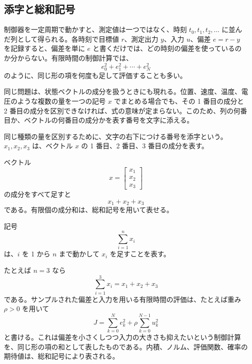 \subsection{添字と総和記号}

制御器を一定周期で動かすと、測定値は一つではなく、時刻 $t_0,t_1,t_2,\ldots$ に並んだ列として得られる。各時刻で目標値 $r$、測定出力 $y$、入力 $u$、偏差 $e=r-y$ を記録すると、偏差を単に $e$ と書くだけでは、どの時刻の偏差を使っているのか分からない。有限時間の制御計算では、
\begin{equation}
  e_0^2+e_1^2+\cdots+e_N^2
\end{equation}
のように、同じ形の項を何度も足して評価することも多い。

同じ問題は、状態ベクトルの成分を扱うときにも現れる。位置、速度、温度、電圧のような複数の量を一つの記号 $x$ でまとめる場合でも、その 1 番目の成分と 2 番目の成分を区別できなければ、式の意味が定まらない。このため、列の何番目か、ベクトルの何番目の成分かを表す番号を文字に添える。

\begin{definition}[添字]
同じ種類の量を区別するために、文字の右下につける番号を添字という。$x_1,x_2,x_3$ は、ベクトル $x$ の 1 番目、2 番目、3 番目の成分を表す。
\end{definition}

ベクトル
\begin{equation}
  x=\begin{bmatrix}x_1\\x_2\\x_3\end{bmatrix}
\end{equation}
の成分をすべて足すと
\begin{equation}
  x_1+x_2+x_3
\end{equation}
である。有限個の成分和は、総和記号を用いて表せる。

\begin{definition}[総和記号]
記号
\begin{equation}
  \sum_{i=1}^{n}x_i
\end{equation}
は、$i$ を 1 から $n$ まで動かして $x_i$ を足すことを表す。
\end{definition}

たとえば $n=3$ なら
\begin{equation}
  \sum_{i=1}^{3}x_i=x_1+x_2+x_3
\end{equation}
である。サンプルされた偏差と入力を用いる有限時間の評価は、たとえば重み $\rho>0$ を用いて
\begin{equation}
  J=\sum_{k=0}^{N}e_k^2+\rho\sum_{k=0}^{N-1}u_k^2
\end{equation}
と書ける。これは偏差を小さくしつつ入力の大きさも抑えたいという制御計算を、同じ形の項の和として表したものである。内積、ノルム、評価関数、確率の期待値は、総和記号により表される。

